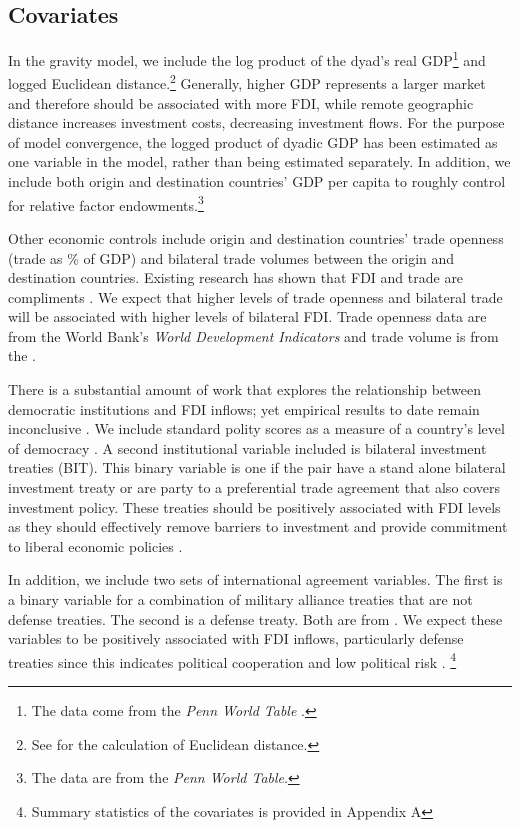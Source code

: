\documentclass[reqno,onecolumn,letterpaper,12pt]{article}
\begin{document}
\subsection{Covariates}

In the gravity model, we include the log product of the dyad's real GDP\footnote{The data come from the \textit{Penn World Table}  \citep{feenstra2015next}.} and logged Euclidean distance.\footnote{See \citet{mayer2011notes} for the calculation of Euclidean distance.} Generally, higher GDP represents a larger market and therefore should be associated with more FDI, while remote geographic distance increases investment costs, decreasing investment flows. For the purpose of model convergence, the logged product of dyadic GDP has been estimated as one variable in the model, rather than being estimated separately. In addition, we include both origin and destination countries' GDP per capita to roughly control for relative factor endowments.\footnote{The data are from the \textit{Penn World Table}.}

Other economic controls include origin and destination countries' trade openness (trade as \% of GDP) and bilateral trade volumes between the origin and destination countries. Existing research has shown that FDI and trade are compliments \citep{aizenman2006fdi,Markusen:1995}. We expect that higher levels of trade openness and bilateral trade will be associated with higher levels of bilateral FDI. Trade openness data are from the World Bank's \textit{World Development Indicators} and trade volume is from the \citet{OECD}.

There is a substantial amount of work that explores the relationship between democratic institutions and FDI inflows; yet empirical results to date remain inconclusive \citep[see e.g.][]{Henisz:2000,Jensen:2003,Li_Resnick:2003,Jakobsen_DeSoysa:2006,Resnick:2001}. We include standard polity scores as a measure of a country's level of democracy \citep{Marshall_Jaggers:2010}. A second institutional variable included is bilateral investment treaties (BIT). This binary variable is one if the pair have a stand alone bilateral investment treaty or are party to a preferential trade agreement that also covers investment policy. These treaties should be positively associated with FDI levels as they should effectively remove barriers to investment and provide commitment to liberal economic policies \citep{Buthe_Milner:2008,buthe2014foreign}.

In addition, we include two sets of international agreement variables. The first is a binary variable for a combination of military alliance treaties that are not defense treaties. The second is a defense treaty. Both are from \citet{Gibler09}. We expect these variables to be positively associated with FDI inflows, particularly defense treaties since this indicates political cooperation and low political risk \citep{Li_Vashchilko:2010}. \footnote{Summary statistics of the covariates is provided in  Appendix A}
\end{document}
